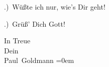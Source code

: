 .) Wüßte ich nur, {\pb} wie’s Dir geht!\pend
           
.) Grüß’ Dich Gott!\pend
           
\pstart
           In Treue {\\[\baselineskip]}Dein {\\[\baselineskip]}\spacefill\mbox{Paul Goldmann}\pend
           \leftskip=0em{}\endnumbering{}  \newcommand{\dateiname}{L02755}\newcommand{\titel}{Paul Goldmann an Arthur Schnitzler, 13. 11. [1895]}\newcommand{\editorInnen}{Martin Anton Müller und Laura Untner}
